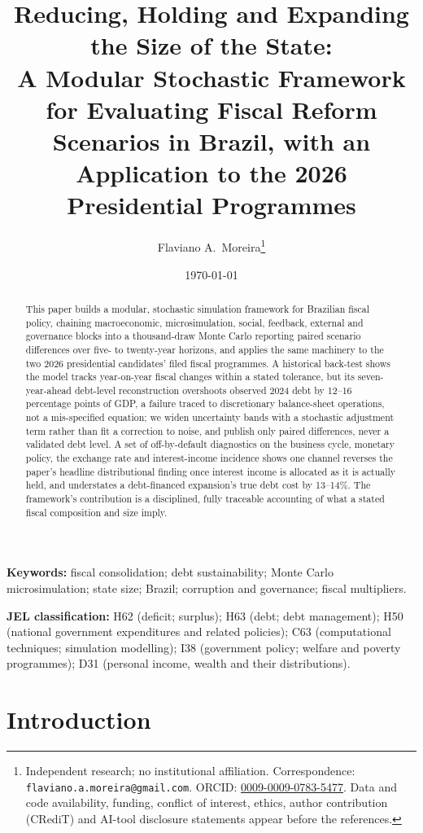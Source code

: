 \documentclass[11pt,a4paper]{article}
\title{\textbf{Reducing, Holding and Expanding the Size of the State: \\
A Modular Stochastic Framework for Evaluating Fiscal Reform Scenarios in Brazil, with an Application to the 2026 Presidential Programmes}}
\author{Flaviano A.\ Moreira\thanks{Independent research; no institutional affiliation. Correspondence: \texttt{flaviano.a.moreira@gmail.com}. ORCID: \href{https://orcid.org/0009-0009-0783-5477}{0009-0009-0783-5477}. Data and code availability, funding, conflict of interest, ethics, author contribution (CRediT) and AI-tool disclosure statements appear before the references.}}
\date{\today}
\begin{document}
\maketitle

\begin{abstract}
\noindent This paper builds a modular, stochastic simulation framework for Brazilian fiscal policy, chaining macroeconomic, microsimulation, social, feedback, external and governance blocks into a thousand-draw Monte Carlo reporting paired scenario differences over five- to twenty-year horizons, and applies the same machinery to the two 2026 presidential candidates' filed fiscal programmes. A historical back-test shows the model tracks year-on-year fiscal changes within a stated tolerance, but its seven-year-ahead debt-level reconstruction overshoots observed 2024 debt by 12--16 percentage points of GDP, a failure traced to discretionary balance-sheet operations, not a mis-specified equation; we widen uncertainty bands with a stochastic adjustment term rather than fit a correction to noise, and publish only paired differences, never a validated debt level. A set of off-by-default diagnostics on the business cycle, monetary policy, the exchange rate and interest-income incidence shows one channel reverses the paper's headline distributional finding once interest income is allocated as it is actually held, and understates a debt-financed expansion's true debt cost by 13--14\%. The framework's contribution is a disciplined, fully traceable accounting of what a stated fiscal composition and size imply.
\end{abstract}

\noindent\textbf{Keywords:} fiscal consolidation; debt sustainability; Monte Carlo microsimulation; state size; Brazil; corruption and governance; fiscal multipliers.

\noindent\textbf{JEL classification:} H62 (deficit; surplus); H63 (debt; debt management); H50 (national government expenditures and related policies); C63 (computational techniques; simulation modelling); I38 (government policy; welfare and poverty programmes); D31 (personal income, wealth and their distributions).

\vspace{0.3cm}

\section{Introduction}
\end{document}
